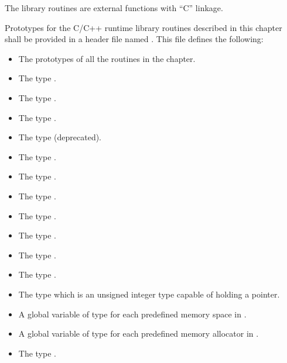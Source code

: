 \begin{ccppspecific}
The library routines are external functions with ``C'' linkage.

Prototypes for the C/C++ runtime library routines described in this chapter shall be
provided in a header file named . This file defines the following:

\begin{itemize}
\item The prototypes of all the routines in the chapter.

\item The type .

\item The type .

\item The type .

\item The type  (deprecated).

\item The type .

\item The type .

\item The type .

\item The type .

\item The type .

\item The type .

\item The type .

\item The type  which is an unsigned integer type capable of holding a pointer.

\item A global variable of type  for each predefined memory space in .

\item A global variable of type  for each predefined memory allocator in .

\item The type .


\end{itemize}
\end{ccppspecific}
